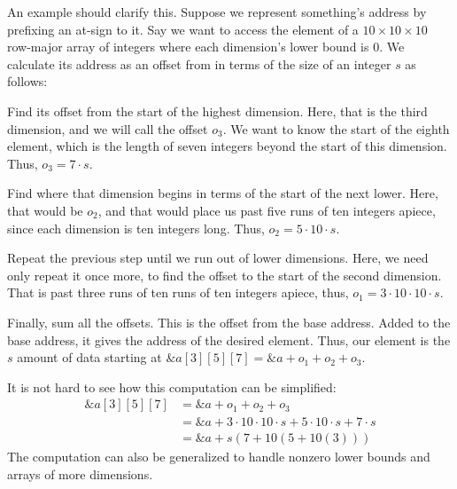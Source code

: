 An example should clarify this. Suppose we represent something's address by prefixing an at-sign \code{\&} to it. Say we want to access the element  of a $10 \times 10 \times 10$ row-major array of integers where each dimension's lower bound is 0. We calculate its address as an offset from  in terms of the size of an integer $s$ as follows:
\begin{aenumerate}
\item Find its offset from the start of the highest dimension. Here, that is the third dimension, and we will call the offset $o_{3}$. We want to know the start of the eighth element, which is the length of seven integers beyond the start of this dimension. Thus, $o_{3} = 7 \cdot s$.
\item Find where that dimension begins in terms of the start of the next lower. Here, that would be $o_{2}$, and that would place us past five runs of ten integers apiece, since each dimension is ten integers long. Thus, $o_{2} = 5 \cdot 10 \cdot s$.
\item Repeat the previous step until we run out of lower dimensions. Here, we need only repeat it once more, to find the offset to the start of the second dimension. That is past three runs of ten runs of ten integers apiece, thus, $o_{1} = 3 \cdot 10 \cdot 10 \cdot s$.
\item Finally, sum all the offsets. This is the offset from the base address. Added to the base address, it gives the address of the desired element. Thus, our element is the $s$ amount of data starting at $\&a[3][5][7] = \&a + o_{1} + o_{2} + o_{3}.$
\end{aenumerate}
It is not hard to see how this computation can be simplified:
\begin{align*}
\&a[3][5][7] &= \&a + o_{1} + o_{2} + o_{3}\\
&= \&a + 3 \cdot 10 \cdot 10 \cdot s + 5 \cdot 10 \cdot s + 7 \cdot s\\
&= \&a + s(7 + 10(5 + 10(3)))
\end{align*}
The computation can also be generalized to handle nonzero lower bounds and arrays of more dimensions.

